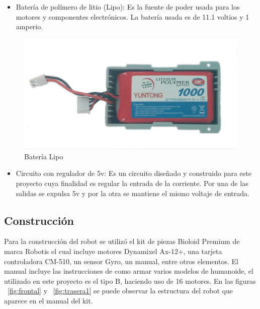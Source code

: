\begin{itemize}
\item Batería de polímero de litio (Lipo): Es la fuente de poder usada para los motores y componentes electr\'onicos. La batería usada es de 11.1 voltios y 1 amperio. \cite{bateria}
\end{itemize}


\begin{figure}[hbtp]
\centering
\includegraphics[scale=0.1]{imagenes/bateriaLipo.jpg}
\caption{Batería Lipo}
\label{bateria}
\end{figure}

\begin{itemize}
\item Circuito con regulador de 5v: Es un circuito diseñado y construido para este proyecto cuya finalidad es regular la entrada de la corriente. Por una de las salidas se expulsa 5v y por la otra se mantiene el mismo voltaje de entrada. 
\end{itemize}


\label{subsection:construccion}
\subsection{Construcción}
Para la construcción del robot se utilizó el kit de piezas Bioloid Premium de marca Robotis el cual incluye motores Dynamixel Ax-12+, una tarjeta controladora CM-510, un sensor Gyro, un manual, entre otros elementos. El manual incluye las instrucciones de como armar varios modelos de humanoide, el utilizado en este proyecto es el tipo B, haciendo uso de 16 motores. En las figuras ~\ref{fig:frontal} y ~\ref{fig:trasera1} se puede observar la estructura del robot que aparece en el manual del kit. 

